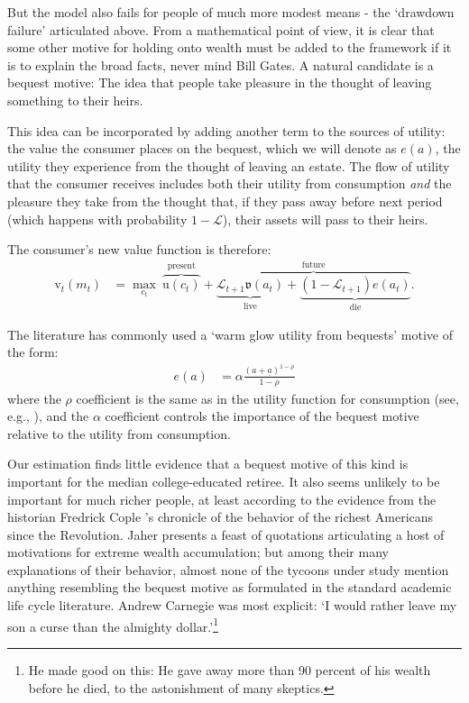 \documentclass{article}
\newcommand{\CRRA}{\rho}
\newcommand{\uFunc}{\mathrm{u}}
\newcommand{\vFunc}{\mathrm{v}}
\newcommand{\Alive}{\mathcal{L}}
\newcommand{\cNrm}{c}
\newcommand{\aNrm}{a}
\newcommand{\mNrm}{m}
\newcommand{\bqstNrm}{e}
\begin{document}
But the model also fails for people of much more modest means - the `drawdown failure' articulated above.
From a mathematical point of view, it is clear that some other motive for holding onto wealth must be added to the framework if it is to explain the broad facts, never mind Bill Gates.
A natural candidate is a bequest motive: The idea that people take pleasure in the thought of leaving something to their heirs.

This idea can be incorporated by adding another term to the sources of utility: the value the consumer places on the bequest, which we will denote as $\bqstNrm(\aNrm)$, the utility they experience from the thought of leaving an $\bqstNrm$state.
The flow of utility that the consumer receives includes both their utility from consumption \textit{and} the pleasure they take from the thought that, if they pass away before next period (which happens with probability $1 -\Alive$), their assets will pass to their heirs.

The consumer's new value function is therefore:
\begin{align}
    {\vFunc}_{t}({\mNrm}_{t}) & = \max_{\cNrm_{t}} ~ \overbrace{\uFunc(\cNrm_{t})}^{\text{present}}+\overbrace{\underbrace{\Alive_{t+1}\mathfrak{v}(\aNrm_{t})}_{\text{live}} + \underbrace{(1-\Alive_{t+1})\bqstNrm({\aNrm}_{t})}_{\text{die}}
    }^{\text{future}}.
\end{align}

The literature has commonly used a `warm glow utility from bequests' motive of the form:
\begin{align}
    \bqstNrm(a) & = \alpha\frac{(a+\underline{a})^{1-\CRRA}}{1-\CRRA}
\end{align}
where the $\CRRA$ coefficient is the same as in the utility function for consumption (see, e.g., \cite{deNardiBequest}), and the $\alpha$ coefficient controls the importance of the bequest motive relative to the utility from consumption.

Our estimation finds little evidence that a bequest motive of this kind is important for the median college-educated retiree.
It also seems unlikely to be important for much richer people, at least according to the evidence from the historian Fredrick Cople \cite{jaherGilded}'s chronicle of the behavior of the richest Americans since the Revolution.
Jaher presents a feast of quotations articulating a host of motivations for extreme wealth accumulation; but among their many explanations of their behavior, almost none of the tycoons under study mention anything resembling the bequest motive as formulated in the standard academic life cycle literature.
Andrew Carnegie was most explicit: `I would rather leave my son a curse than the almighty dollar.'\footnote{He made good on this: He gave away more than 90 percent of his wealth before he died, to the astonishment of many skeptics.}
\end{document}
